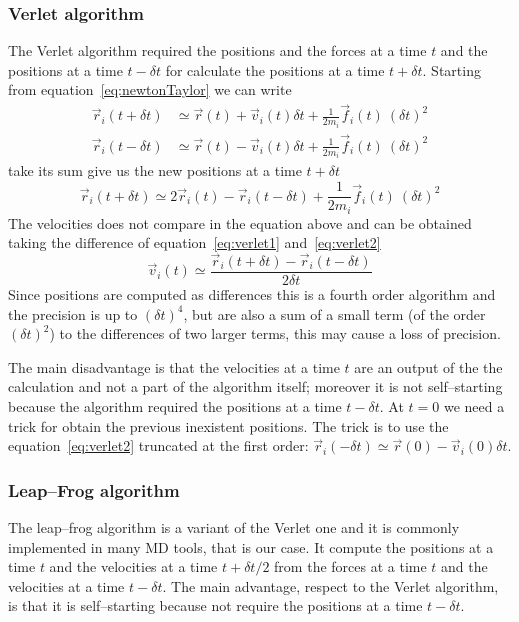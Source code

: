\subsubsection{Verlet algorithm}
The Verlet algorithm required the positions and the forces at a time $t$ and the positions at a time $t-\delta t$ for calculate the  positions at a time $t+\delta t$. Starting from equation~\eqref{eq:newtonTaylor} we can write
\begin{align}
	\vec r_i(t+\delta t) &\simeq \vec r(t) + \vec v_i(t)\delta t + \frac{1}{2m_i}\vec f_i(t)\ (\delta t)^2
	\label{eq:verlet1} \\
	\vec r_i(t-\delta t) &\simeq \vec r(t) - \vec v_i(t)\delta t + \frac{1}{2m_i}\vec f_i(t)\ (\delta t)^2
	\label{eq:verlet2}
\end{align}
take its sum give us the new positions at a time $t+\delta t$
\begin{equation*}
	\vec r_i(t+\delta t) \simeq 2 \vec r_i(t) - \vec r_i (t - \delta t) + \frac{1}{2m_i}\vec f_i(t)\ (\delta t)^2
\end{equation*}
The velocities does not compare in the equation above and can be obtained taking the difference of equation~\eqref{eq:verlet1} and~\eqref{eq:verlet2}
\begin{equation*}
	\vec v_i(t) \simeq \frac{\vec r_i(t+\delta t) - \vec r_i(t-\delta t)}{2\delta t}
\end{equation*}
Since positions are computed as differences this is a fourth order algorithm and the precision is up to $(\delta t)^4$, but are also a sum of a small term (of the order $(\delta t)^2$) to the differences of two larger terms, this may cause a loss of precision.

The main disadvantage is that the velocities at a time $t$ are an output of the the calculation and not a part of the algorithm itself; moreover it is not self--starting because the algorithm required the positions at a time $t-\delta t$. At $t=0$ we need a trick for obtain the previous inexistent positions. The trick is to use the equation~\eqref{eq:verlet2} truncated at the first order: $\vec r_i(-\delta t) \simeq \vec r(0) - \vec v_i(0)\delta t$.

\subsubsection{Leap--Frog algorithm}
The leap--frog algorithm is a variant of the Verlet one and it is commonly implemented in many \ac{MD} tools, that is our case. It compute the positions at a time $t$ and the velocities at a time $t+\delta t/2$ from the forces at a time $t$ and the velocities at a time $t-\delta t$. The main advantage, respect to the Verlet algorithm, is that it is self--starting because not require the positions at a time $t-\delta t$.


